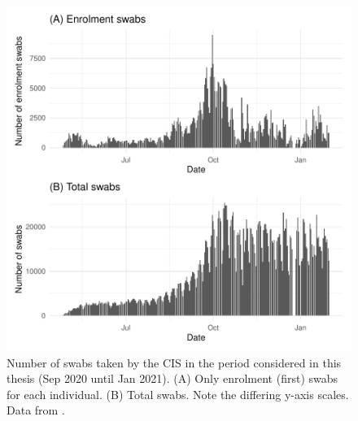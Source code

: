 \documentclass[thesis.tex]{subfiles}
\begin{document}
\begin{figure}
  \centering \includegraphics{biology-data/CIS-recruitment}
  \caption[CIS swab numbers]{%
    Number of swabs taken by the CIS in the period considered in this thesis (Sep 2020 until Jan 2021).
    (A) Only enrolment (\ie first) swabs for each individual.
    (B) Total swabs.
    Note the differing y-axis scales.
    Data from \textcite{CIStechData}.
  }
  \label{biology-data:fig:CIS-recruitment}
\end{figure}
\end{document}
